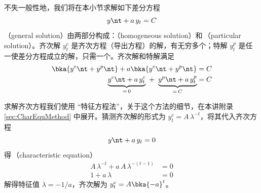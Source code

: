 不失一般性地，我们将在本小节求解如下差分方程
\begin{equation}\label{eq:DiffEqu}
    y\nt+a\,y_t=C
\end{equation}
（general solution）由两部分构成：（homogeneous solution）和\,（particular solution）。齐次解 \(y_t^c\) 是齐次方程（导出方程）的解，有无穷多个；特解 \(y_t^p\) 是任一使差分方程成立的解，只需一个。齐次解和特解满足
\begin{align}
    \bka{y^c\nt+y^p\nt}+a\bka{y^c\nt+y^p\nt}&=C\\
    \underbrace{y^c\nt+a\,y^c_t}_{=\,0} \ + \ \underbrace{y^p\nt+a\,y^p_t}_{=\,C}&=C
\end{align}

求解齐次方程我们使用 “特征方程法”，关于这个方法的细节，在本讲附录 \ref{sec:CharEquMethod} 中展开。猜测齐次解的形式为 \(y_t^c=A\,\lambda^{-t}\)，将其代入齐次方程
\begin{equation}
    y\nt+a\,y_t=0
\end{equation}
得\,（characteristic equation）
\begin{align}
    A\,\lambda^{-t} + a\,A\,\lambda^{-(t-1)}&=0\\
    1 + a\,\lambda&=0
\end{align}
解得特征值 \(\lambda=-1/a\)，齐次解为 \(y_t^c=A\bka{-a}^{t}\)。

